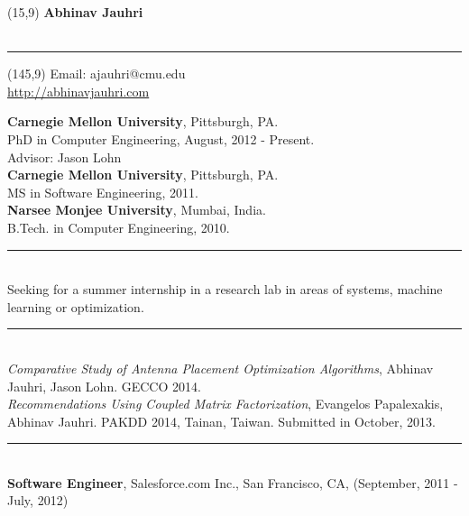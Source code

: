 \documentclass[a4paper,oneside,english]{article}
\begin{document}

\begin{textblock}{50}(15,9)
	\noindent \textbf{\huge Abhinav Jauhri}  \\ \\
        \rule{7in}{0.4pt}
\end{textblock}

\begin{textblock}{50}(145,9)
	\noindent Email: ajauhri@cmu.edu  \\
	\noindent \url{http://abhinavjauhri.com} \\
\end{textblock}

\reversemarginpar
{} 
\noindent \textbf{Carnegie Mellon University}, Pittsburgh, PA.  \\ PhD in Computer Engineering, August, 2012 - Present. \\ Advisor: Jason Lohn  \vspace*{2mm} \\
\textbf{Carnegie Mellon University}, Pittsburgh, PA. \\ MS in Software Engineering, 2011. \vspace*{2mm} \\
\textbf{Narsee Monjee University}, Mumbai, India. \\ B.Tech. in Computer Engineering, 2010. \\
\noindent\rule{6in}{0.4pt}  \\[4pt]
\noindent Seeking for a summer internship in a research lab in areas of systems, machine learning or optimization. \\
\noindent\rule{6in}{0.4pt} \\[4pt]
\textit{Comparative Study of Antenna Placement Optimization Algorithms}, Abhinav Jauhri, Jason Lohn. GECCO 2014. \vspace*{2mm} \\
\textit{Recommendations Using Coupled Matrix Factorization}, Evangelos Papalexakis, Abhinav Jauhri. PAKDD 2014, Tainan, Taiwan. Submitted in October, 2013. \\
\noindent\rule{6in}{0.4pt} \\[4pt]
 \textbf{Software Engineer}, Salesforce.com Inc., San Francisco, CA, (September, 2011 - July, 2012)
\end{document}
